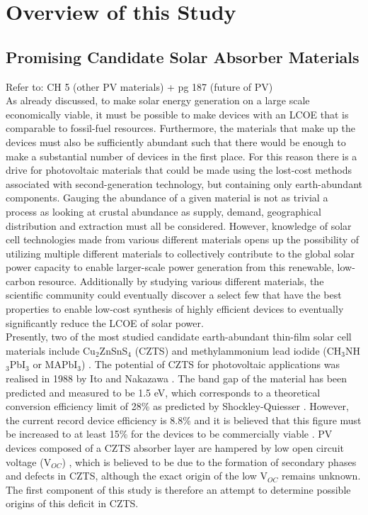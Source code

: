 \section{Overview of this Study}

\subsection{Promising Candidate Solar Absorber Materials}
Refer to: CH 5 (other PV materials) + pg 187 (future of PV) \cite{PV_Goetzberger}\\

As already discussed, to make solar energy generation on a large scale economically viable, it must be possible to make devices with an LCOE that is comparable to fossil-fuel resources. Furthermore, the materials that make up the devices must also be sufficiently abundant such that there would be enough to make a substantial number of devices in the first place. For this reason there is a drive for photovoltaic materials that could be made using the lost-cost methods associated with second-generation technology, but containing only earth-abundant components. Gauging the abundance of a given material is not as trivial a process as looking at crustal abundance as supply, demand, geographical distribution and extraction must all be considered. However, knowledge of solar cell technologies made from various different materials opens up the possibility of utilizing multiple different materials to collectively contribute to the global solar power capacity to enable larger-scale power generation from this renewable, low-carbon resource. Additionally by studying various different materials, the scientific community could eventually discover a select few that have the best properties to enable low-cost synthesis of highly efficient devices to eventually significantly reduce the LCOE of solar power.\\

Presently, two of the most studied candidate earth-abundant thin-film solar cell materials include Cu$_2$ZnSnS$_4$ (CZTS) and methylammonium lead iodide (CH$_3$NH$_3$PbI$_3$ or MAPbI$_3$) \cite{CZTS_vs_MAPI}. The potential of CZTS for photovoltaic applications was realised in 1988 by Ito and Nakazawa \cite{first_CZTS}. The band gap of the material has been predicted \cite{CZTS_bandgap_theory} and measured \cite{CZTS_bandgap_exp} to be 1.5 eV, which corresponds to a theoretical conversion efficiency limit of 28\% as predicted by Shockley-Quiesser \cite{SQ_1961}. However, the current record device efficiency is 8.8\% \cite{CZTS_record} and it is believed that this figure must be increased to at least 15\% for the devices to be commercially viable \cite{SS}. PV devices composed of a CZTS absorber layer are hampered by low open circuit voltage (V$_{OC}$) \cite{SS}, which is believed to be due to the formation of secondary phases \cite{CZTS_phases} and defects \cite{CZTS_defects} in CZTS, although the exact origin of the low V$_{OC}$ remains unknown. The first component of this study is therefore an attempt to determine possible origins of this deficit in CZTS.\\

